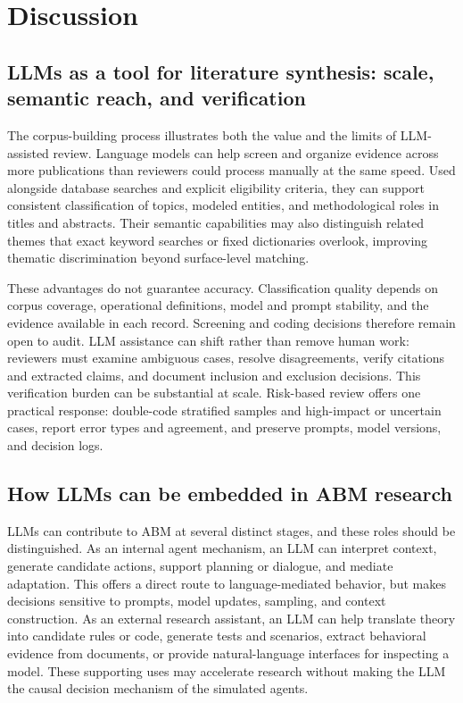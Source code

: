 \section{Discussion}

\subsection{LLMs as a tool for literature synthesis: scale, semantic reach, and verification}

The corpus-building process illustrates both the value and the limits of LLM-assisted review. Language models can help screen and organize evidence across more publications than reviewers could process manually at the same speed. Used alongside database searches and explicit eligibility criteria, they can support consistent classification of topics, modeled entities, and methodological roles in titles and abstracts. Their semantic capabilities may also distinguish related themes that exact keyword searches or fixed dictionaries overlook, improving thematic discrimination beyond surface-level matching.

These advantages do not guarantee accuracy. Classification quality depends on corpus coverage, operational definitions, model and prompt stability, and the evidence available in each record. Screening and coding decisions therefore remain open to audit. LLM assistance can shift rather than remove human work: reviewers must examine ambiguous cases, resolve disagreements, verify citations and extracted claims, and document inclusion and exclusion decisions. This verification burden can be substantial at scale. Risk-based review offers one practical response: double-code stratified samples and high-impact or uncertain cases, report error types and agreement, and preserve prompts, model versions, and decision logs.

\subsection{How LLMs can be embedded in ABM research}

LLMs can contribute to ABM at several distinct stages, and these roles should be distinguished. As an internal agent mechanism, an LLM can interpret context, generate candidate actions, support planning or dialogue, and mediate adaptation. This offers a direct route to language-mediated behavior, but makes decisions sensitive to prompts, model updates, sampling, and context construction. As an external research assistant, an LLM can help translate theory into candidate rules or code, generate tests and scenarios, extract behavioral evidence from documents, or provide natural-language interfaces for inspecting a model. These supporting uses may accelerate research without making the LLM the causal decision mechanism of the simulated agents.

